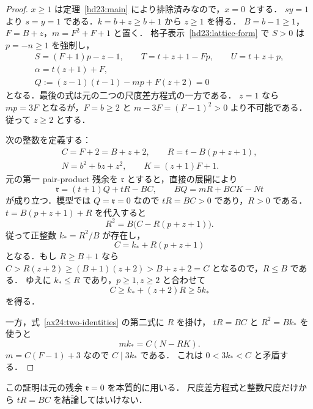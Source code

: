 \begin{proof}
$x\ge1$ は定理~\ref{hd23:main} により排除済みなので，$x=0$ とする．
$sy=1$ より $s=y=1$ である．$k=b+z\ge b+1$ から $z\ge1$ を得る．
$B=b-1\ge1$，$F=B+z$，$m=F^2+F+1$ と置く．
格子表示~\eqref{hd23:lattice-form} で $S>0$ は $p=-n\ge1$ を強制し，
\begin{equation}\label{ax24:axis-data}
 \begin{gathered}
 S=(F+1)p-z-1,\qquad T=t+z+1-Fp,\qquad U=t+z+p,\\
 \alpha=t(z+1)+F,\\
 Q:=(z-1)(t-1)-mp+F(z+2)=0
 \end{gathered}
\end{equation}
となる．最後の式は元の二つの尺度差方程式の一方である．
$z=1$ なら $mp=3F$ となるが，$F=b\ge2$ と
$m-3F=(F-1)^2>0$ より不可能である．従って $z\ge2$ とする．

次の整数を定義する：
\begin{equation}\label{ax24:axis-auxiliary}
 \begin{gathered}
 C=F+2=B+z+2,\qquad R=t-B(p+z+1),\\
 N=b^2+bz+z^2,\qquad K=(z+1)F+1.
 \end{gathered}
\end{equation}
元の第一 pair-product 残余を $\mathfrak r$ とすると，直接の展開により
\begin{equation}\label{ax24:two-identities}
 \mathfrak r=(t+1)Q+tR-BC,\qquad
 BQ=mR+BCK-Nt
\end{equation}
が成り立つ．模型では $Q=\mathfrak r=0$ なので $tR=BC>0$ であり，$R>0$ である．
$t=B(p+z+1)+R$ を代入すると
\[
 R^2=B\bigl(C-R(p+z+1)\bigr).
\]
従って正整数 $k_*=R^2/B$ が存在し，
\begin{equation}\label{ax24:small-divisor}
 C=k_*+R(p+z+1)
\end{equation}
となる．もし $R\ge B+1$ なら
$C>R(z+2)\ge(B+1)(z+2)>B+z+2=C$ となるので，$R\le B$ である．
ゆえに $k_*\le R$ であり，$p\ge1,z\ge2$ と合わせて
\begin{equation}\label{ax24:large-C}
 C\ge k_*+(z+2)R\ge5k_*
\end{equation}
を得る．

一方，式~\eqref{ax24:two-identities} の第二式に $R$ を掛け，
$tR=BC$ と $R^2=Bk_*$ を使うと
\[
 mk_*=C(N-RK).
\]
$m=C(F-1)+3$ なので $C\mid3k_*$ である．
これは $0<3k_*<C$ と矛盾する．
\end{proof}

この証明は元の残余 $\mathfrak r=0$ を本質的に用いる．
尺度差方程式と整数尺度だけから $tR=BC$ を結論してはいけない．


